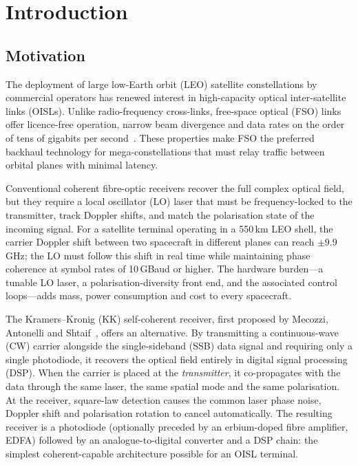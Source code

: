 \chapter{Introduction}

\section{Motivation}

The deployment of large low-Earth orbit (LEO) satellite constellations by commercial operators has renewed interest in high-capacity optical inter-satellite links (OISLs). Unlike radio-frequency cross-links, free-space optical (FSO) links offer licence-free operation, narrow beam divergence and data rates on the order of tens of gigabits per second~\cite{kaushal2017}. These properties make FSO the preferred backhaul technology for mega-constellations that must relay traffic between orbital planes with minimal latency.

Conventional coherent fibre-optic receivers recover the full complex optical field, but they require a local oscillator (LO) laser that must be frequency-locked to the transmitter, track Doppler shifts, and match the polarisation state of the incoming signal. For a satellite terminal operating in a 550\,km LEO shell, the carrier Doppler shift between two spacecraft in different planes can reach $\pm9.9$\,GHz; the LO must follow this shift in real time while maintaining phase coherence at symbol rates of 10\,GBaud or higher. The hardware burden---a tunable LO laser, a polarisation-diversity front end, and the associated control loops---adds mass, power consumption and cost to every spacecraft.

The Kramers--Kronig (KK) self-coherent receiver, first proposed by Mecozzi, Antonelli and Shtaif~\cite{mecozzi2016}, offers an alternative. By transmitting a continuous-wave (CW) carrier alongside the single-sideband (SSB) data signal and requiring only a single photodiode, it recovers the optical field entirely in digital signal processing (DSP). When the carrier is placed at the \emph{transmitter}, it co-propagates with the data through the same laser, the same spatial mode and the same polarisation. At the receiver, square-law detection causes the common laser phase noise, Doppler shift and polarisation rotation to cancel automatically. The resulting receiver is a photodiode (optionally preceded by an erbium-doped fibre amplifier, EDFA) followed by an analogue-to-digital converter and a DSP chain: the simplest coherent-capable architecture possible for an OISL terminal.

